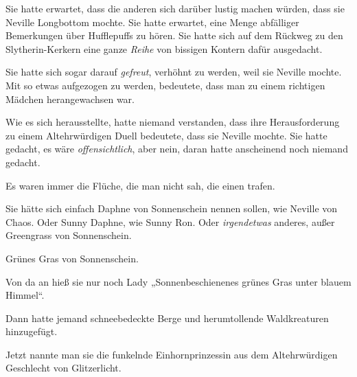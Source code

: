 Sie hatte erwartet, dass die anderen sich darüber lustig machen würden, dass sie Neville Longbottom mochte. Sie hatte erwartet, eine Menge abfälliger Bemerkungen über Hufflepuffs zu hören. Sie hatte sich auf dem Rückweg zu den Slytherin-Kerkern eine ganze \emph{Reihe} von bissigen Kontern dafür ausgedacht.

Sie hatte sich sogar darauf \emph{gefreut}, verhöhnt zu werden, weil sie Neville mochte. Mit so etwas aufgezogen zu werden, bedeutete, dass man zu einem richtigen Mädchen herangewachsen war.

Wie es sich herausstellte, hatte niemand verstanden, dass ihre Herausforderung zu einem Altehrwürdigen Duell bedeutete, dass sie Neville mochte. Sie hatte gedacht, es wäre \emph{offensichtlich}, aber nein, daran hatte anscheinend noch niemand gedacht.

Es waren immer die Flüche, die man nicht sah, die einen trafen.

Sie hätte sich einfach Daphne von Sonnenschein nennen sollen, wie Neville von Chaos. Oder Sunny Daphne, wie Sunny Ron. Oder \emph{irgendetwas} anderes, außer Greengrass von Sonnenschein.

Grünes Gras von Sonnenschein.

Von da an hieß sie nur noch Lady „Sonnenbeschienenes grünes Gras unter blauem Himmel“.

Dann hatte jemand schneebedeckte Berge und herumtollende Waldkreaturen hinzugefügt.

Jetzt nannte man sie die funkelnde Einhornprinzessin aus dem Altehrwürdigen Geschlecht von Glitzerlicht.

